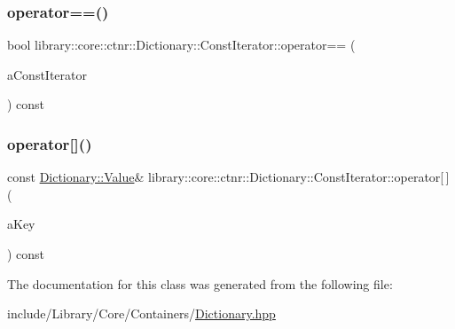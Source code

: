 \mbox{\label{classlibrary_1_1core_1_1ctnr_1_1_dictionary_1_1_const_iterator_a83feb60687b0d6b1e05afd2c92d1534f}} 
\subsubsection{\texorpdfstring{operator==()}{operator==()}}
{\footnotesize\ttfamily bool library\+::core\+::ctnr\+::\+Dictionary\+::\+Const\+Iterator\+::operator== (\begin{DoxyParamCaption}\item[{const \hyperlink{classlibrary_1_1core_1_1ctnr_1_1_dictionary_1_1_const_iterator}{Const\+Iterator} \&}]{a\+Const\+Iterator }\end{DoxyParamCaption}) const}

\mbox{\label{classlibrary_1_1core_1_1ctnr_1_1_dictionary_1_1_const_iterator_a06156b80cc285d4d960316953a70b695}} 
\subsubsection{\texorpdfstring{operator[]()}{operator[]()}}
{\footnotesize\ttfamily const \hyperlink{classlibrary_1_1core_1_1ctnr_1_1_dictionary_a3baf6692694e4fc27cb399ac083c88ea}{Dictionary\+::\+Value}\& library\+::core\+::ctnr\+::\+Dictionary\+::\+Const\+Iterator\+::operator\mbox{[}$\,$\mbox{]} (\begin{DoxyParamCaption}\item[{const \hyperlink{classlibrary_1_1core_1_1ctnr_1_1_dictionary_a987cae687cce70d81a2a483c5e05e842}{Dictionary\+::\+Key} \&}]{a\+Key }\end{DoxyParamCaption}) const}



The documentation for this class was generated from the following file\+:\begin{DoxyCompactItemize}
\item 
include/\+Library/\+Core/\+Containers/\hyperlink{_dictionary_8hpp}{Dictionary.\+hpp}\end{DoxyCompactItemize}
